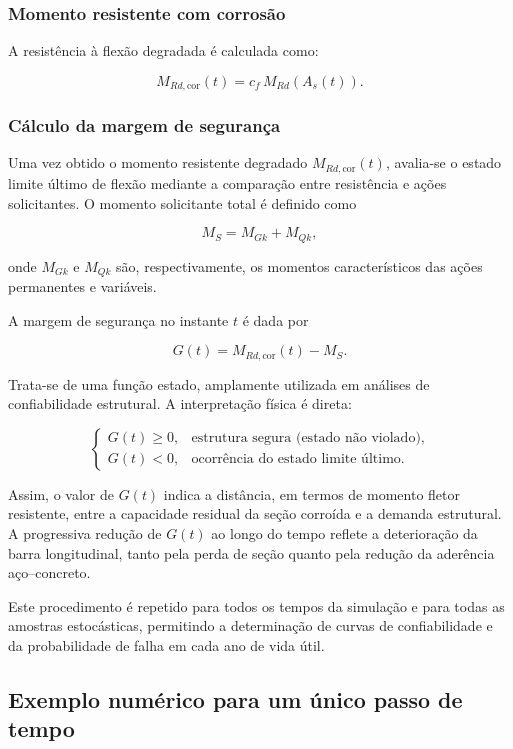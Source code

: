 \subsubsection{Momento resistente com corrosão}

A resistência à flexão degradada é calculada como:

\[
M_{Rd,\mathrm{cor}}(t) = c_f \, M_{Rd}(A_s(t)).
\]

\subsubsection{Cálculo da margem de segurança}

Uma vez obtido o momento resistente degradado $M_{Rd,\mathrm{cor}}(t)$, avalia-se o estado limite último de flexão mediante a comparação entre resistência e ações solicitantes. O momento solicitante total é definido como

\[
M_S = M_{Gk} + M_{Qk},
\]

onde $M_{Gk}$ e $M_{Qk}$ são, respectivamente, os momentos característicos das ações permanentes e variáveis.

A margem de segurança no instante $t$ é dada por

\[
G(t) = M_{Rd,\mathrm{cor}}(t) - M_S.
\]

Trata-se de uma função estado, amplamente utilizada em análises de confiabilidade estrutural. A interpretação física é direta:

\[
\begin{cases}
G(t) \ge 0, & \text{estrutura segura (estado não violado)}, \\[4pt]
G(t) < 0,  & \text{ocorrência do estado limite último}.
\end{cases}
\]

Assim, o valor de $G(t)$ indica a distância, em termos de momento fletor resistente, entre a capacidade residual da seção corroída e a demanda estrutural. A progressiva redução de $G(t)$ ao longo do tempo reflete a deterioração da barra longitudinal, tanto pela perda de seção quanto pela redução da aderência aço–concreto.

Este procedimento é repetido para todos os tempos da simulação e para todas as amostras estocásticas, permitindo a determinação de curvas de confiabilidade e da probabilidade de falha em cada ano de vida útil.

\subsection{Exemplo numérico para um único passo de tempo}

